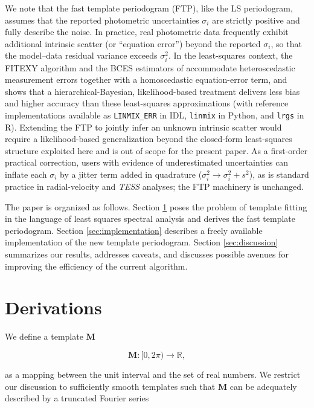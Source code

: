 \documentclass[apj]{emulateapj}
\begin{document}
We note that the fast template periodogram (FTP), like the LS periodogram, assumes that the reported
photometric uncertainties $\sigma_i$ are strictly positive and fully describe the noise.
In practice, real photometric data frequently exhibit additional intrinsic scatter (or ``equation error'')
beyond the reported $\sigma_i$, so that the model--data residual variance exceeds $\sigma_i^2$.
In the least-squares context, the FITEXY algorithm \citep[Press et al. 1992, \emph{Numerical Recipes};
see also][]{Press+Rybicki_1989} and the BCES estimators of \citet{Akritas+Bershady_1996}
accommodate heteroscedastic measurement errors together with a homoscedastic equation-error term,
and \citet{Kelly_2007} shows that a hierarchical-Bayesian, likelihood-based treatment
delivers less bias and higher accuracy than these least-squares approximations
(with reference implementations available as \texttt{LINMIX\_ERR} in IDL, \texttt{linmix} in Python,
and \texttt{lrgs} in R). Extending the FTP to jointly infer an unknown intrinsic scatter would
require a likelihood-based generalization beyond the closed-form least-squares structure exploited here
and is out of scope for the present paper. As a first-order practical correction, users with
evidence of underestimated uncertainties can inflate each $\sigma_i$ by a jitter term added in
quadrature ($\sigma_i^2 \rightarrow \sigma_i^2 + s^2$), as is standard practice in radial-velocity
and \emph{TESS} analyses; the FTP machinery is unchanged.

The paper is organized as follows. Section \ref{sec:derivations} poses the problem of template
fitting in the language of least squares spectral analysis and derives the fast template
periodogram. Section \ref{sec:implementation} describes a freely available implementation
of the new template periodogram. Section \ref{sec:discussion} summarizes our results,
addresses caveats, and discusses possible avenues for improving the efficiency of the current
algorithm.


\section{Derivations}\label{sec:derivations}

We define a template $\mathbf{M}$

\begin{equation}
    \mathbf{M} : [0, 2\pi)\rightarrow\mathbb{R},
\end{equation}

\noindent as a mapping between the unit interval and the set of real numbers. We
restrict our discussion to sufficiently smooth templates such that
$\mathbf{M}$ can be adequately described by a truncated Fourier series
\end{document}
